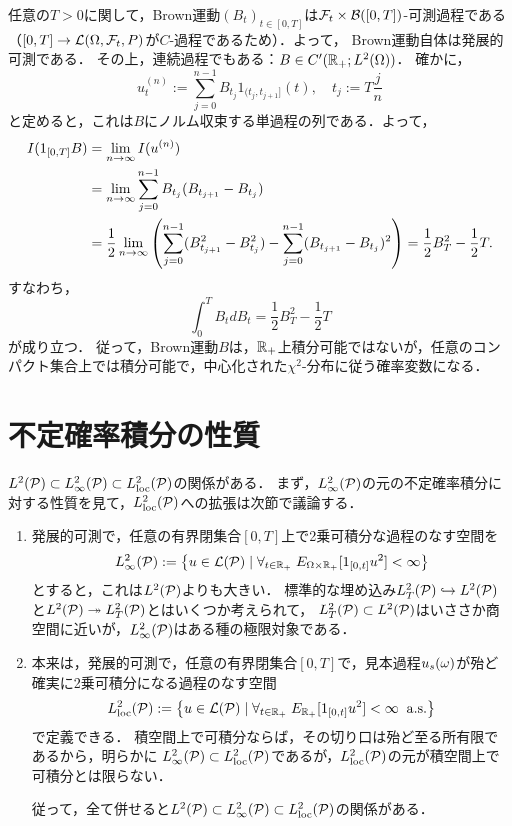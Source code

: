 \documentclass[uplatex,dvipdfmx]{jsreport}
\begin{document}
\begin{example}[Brown運動の不定積分]
    任意の$T>0$に関して，Brown運動$(B_t)_{t\in[0,T]}$は$\F_t\times\B([0,T])$-可測過程である（$[0,T]\to\L(\Om,\F_t,P)$が$C$-過程であるため）．よって，
    Brown運動自体は発展的可測である．
    その上，連続過程でもある：$B\in C'(\R_+;L^2(\Om))$．
    確かに，
    \[u^{(n)}_t:=\sum^{n-1}_{j=0}B_{t_j}1_{(t_j,t_{j+1}]}(t),\quad t_j:=T\frac{j}{n}\]
    と定めると，これは$B$にノルム収束する単過程の列である．よって，
    \begin{align*}
        I(1_{[0,T]}B)&=\lim_{n\to\infty}I(u^{(n)})\\
        &=\lim_{n\to\infty}\sum^{n-1}_{j=0}B_{t_j}(B_{t_{j+1}}-B_{t_j})\\
        &=\frac{1}{2}\lim_{n\to\infty}\paren{\sum^{n-1}_{j=0}(B_{t_{j+1}}^2-B^2_{t_j})-\sum^{n-1}_{j=0}(B_{t_{j+1}}-B_{t_j})^2}=\frac{1}{2}B_T^2-\frac{1}{2}T.
    \end{align*}
    すなわち，
    \[\int^T_0B_tdB_t=\frac{1}{2}B^2_T-\frac{1}{2}T\]
    が成り立つ．
    従って，Brown運動$B$は，$\R_+$上積分可能ではないが，任意のコンパクト集合上では積分可能で，中心化された$\chi^2$-分布に従う確率変数になる．
\end{example}

\section{不定確率積分の性質}

\begin{tcolorbox}[colframe=ForestGreen, colback=ForestGreen!10!white,breakable,colbacktitle=ForestGreen!40!white,coltitle=black,fonttitle=\bfseries\sffamily,
title=]
    $L^2(\P)\subset L^2_\infty(\P)\subset L^2_\loc(\P)$の関係がある．
    まず，$L^2_\infty(\P)$の元の不定確率積分に対する性質を見て，$L^2_\loc(\P)$への拡張は次節で議論する．
\end{tcolorbox}

\begin{notation}\mbox{}
    \begin{enumerate}
        \item 
        発展的可測で，任意の有界閉集合$[0,T]$上で2乗可積分な過程のなす空間を
        \[L^2_\infty(\P):=\Brace{u\in\L(\P)\mid\forall_{t\in\R_+}\;E_{\Om\times\R_+}[1_{[0,t]}u^2]<\infty}\]
        とすると，これは$L^2(\P)$よりも大きい．
        標準的な埋め込み$L^2_T(\P)\mono L^2(\P)$と$L^2(\P)\epi L^2_T(\P)$とはいくつか考えられて，
        $L^2_T(\P)\subset L^2(\P)$はいささか商空間に近いが，$L^2_\infty(\P)$はある種の極限対象である．
        \item 本来は，発展的可測で，任意の有界閉集合$[0,T]$で，見本過程$u_s(\om)$が殆ど確実に2乗可積分になる過程のなす空間
        \[L^2_\loc(\P):=\Brace{u\in\L(\P)\mid\forall_{t\in\R_+}\;E_{\R_+}[1_{[0,t]}u^2]<\infty\;\as}\]
        で定義できる．
        積空間上で可積分ならば，その切り口は殆ど至る所有限であるから，明らかに
        $L^2_\infty(\P)\subset L^2_\loc(\P)$であるが，$L^2_\loc(\P)$の元が積空間上で可積分とは限らない．
        
        従って，全て併せると$L^2(\P)\subset L^2_\infty(\P)\subset L^2_\loc(\P)$の関係がある．
    \end{enumerate}
\end{notation}
\end{document}

